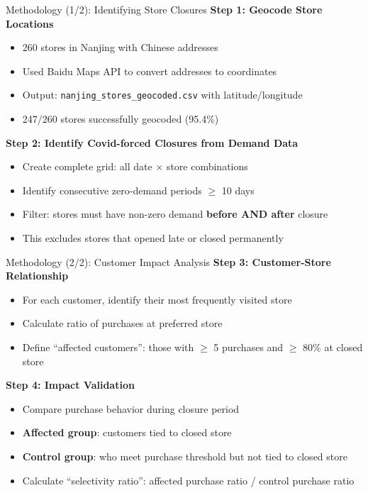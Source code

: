 \documentclass[aspectratio=169]{beamer}  %
\begin{document}
\begin{frame}{Methodology (1/2): Identifying Store Closures}
\textbf{Step 1: Geocode Store Locations}
\begin{itemize}
    \item 260 stores in Nanjing with Chinese addresses
    \item Used Baidu Maps API to convert addresses to coordinates
    \item Output: \texttt{nanjing\_stores\_geocoded.csv} with latitude/longitude
    \item 247/260 stores successfully geocoded (95.4\%)
\end{itemize}

\vspace{0.2cm}

\textbf{Step 2: Identify Covid-forced Closures from Demand Data}
\begin{itemize}
    \item Create complete grid: all date $\times$ store combinations
    \item Identify consecutive zero-demand periods $\geq$ 10 days
    \item Filter: stores must have non-zero demand \textbf{before AND after} closure
    \item This excludes stores that opened late or closed permanently
\end{itemize}
\end{frame}

\begin{frame}{Methodology (2/2): Customer Impact Analysis}
\textbf{Step 3: Customer-Store Relationship}
\begin{itemize}
    \item For each customer, identify their most frequently visited store
    \item Calculate ratio of purchases at preferred store
    \item Define ``affected customers'': those with $\geq$ 5 purchases and $\geq$ 80\% at closed store
\end{itemize}

\vspace{0.2cm}

\textbf{Step 4: Impact Validation}
\begin{itemize}
    \item Compare purchase behavior during closure period
    \item \textbf{Affected group}: customers tied to closed store
    \item \textbf{Control group}: who meet purchase threshold but not tied to closed store
    \item Calculate ``selectivity ratio'': affected purchase ratio / control purchase ratio
\end{itemize}
\end{frame}
\end{document}
